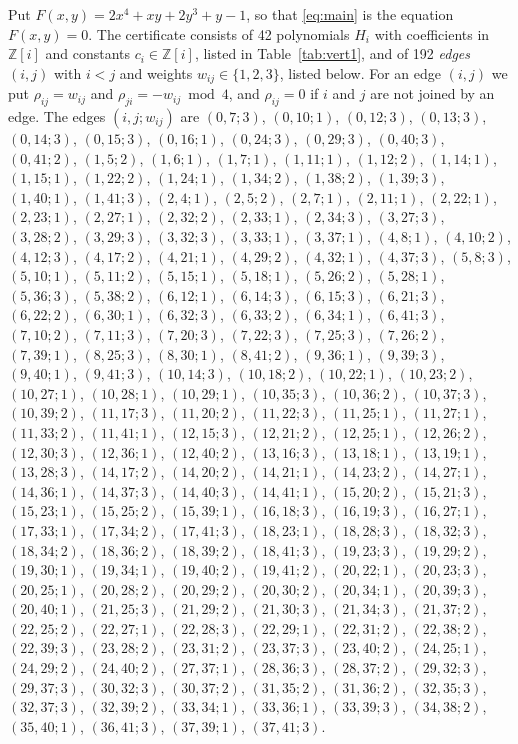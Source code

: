 \documentclass[11pt]{article}
\newcommand{\Z}{\mathbb{Z}}
\begin{document}
Put $F(x,y)=2x^{4}+xy+2y^{3}+y-1$, so that \eqref{eq:main} is the equation $F(x,y)=0$. The certificate consists of 42 polynomials $H_i$ with coefficients in $\Z[i]$ and constants $c_i\in\Z[i]$, listed in Table~\ref{tab:vert1}, and of 192 \emph{edges} $(i,j)$ with $i<j$ and weights $w_{ij}\in\{1,2,3\}$, listed below. For an edge $(i,j)$ we put $\rho_{ij}=w_{ij}$ and $\rho_{ji}=-w_{ij}\bmod 4$, and $\rho_{ij}=0$ if $i$ and $j$ are not joined by an edge.
The edges $(i,j;w_{ij})$ are $(0,7;3)$, $(0,10;1)$, $(0,12;3)$, $(0,13;3)$, $(0,14;3)$, $(0,15;3)$, $(0,16;1)$, $(0,24;3)$, $(0,29;3)$, $(0,40;3)$, $(0,41;2)$, $(1,5;2)$, $(1,6;1)$, $(1,7;1)$, $(1,11;1)$, $(1,12;2)$, $(1,14;1)$, $(1,15;1)$, $(1,22;2)$, $(1,24;1)$, $(1,34;2)$, $(1,38;2)$, $(1,39;3)$, $(1,40;1)$, $(1,41;3)$, $(2,4;1)$, $(2,5;2)$, $(2,7;1)$, $(2,11;1)$, $(2,22;1)$, $(2,23;1)$, $(2,27;1)$, $(2,32;2)$, $(2,33;1)$, $(2,34;3)$, $(3,27;3)$, $(3,28;2)$, $(3,29;3)$, $(3,32;3)$, $(3,33;1)$, $(3,37;1)$, $(4,8;1)$, $(4,10;2)$, $(4,12;3)$, $(4,17;2)$, $(4,21;1)$, $(4,29;2)$, $(4,32;1)$, $(4,37;3)$, $(5,8;3)$, $(5,10;1)$, $(5,11;2)$, $(5,15;1)$, $(5,18;1)$, $(5,26;2)$, $(5,28;1)$, $(5,36;3)$, $(5,38;2)$, $(6,12;1)$, $(6,14;3)$, $(6,15;3)$, $(6,21;3)$, $(6,22;2)$, $(6,30;1)$, $(6,32;3)$, $(6,33;2)$, $(6,34;1)$, $(6,41;3)$, $(7,10;2)$, $(7,11;3)$, $(7,20;3)$, $(7,22;3)$, $(7,25;3)$, $(7,26;2)$, $(7,39;1)$, $(8,25;3)$, $(8,30;1)$, $(8,41;2)$, $(9,36;1)$, $(9,39;3)$, $(9,40;1)$, $(9,41;3)$, $(10,14;3)$, $(10,18;2)$, $(10,22;1)$, $(10,23;2)$, $(10,27;1)$, $(10,28;1)$, $(10,29;1)$, $(10,35;3)$, $(10,36;2)$, $(10,37;3)$, $(10,39;2)$, $(11,17;3)$, $(11,20;2)$, $(11,22;3)$, $(11,25;1)$, $(11,27;1)$, $(11,33;2)$, $(11,41;1)$, $(12,15;3)$, $(12,21;2)$, $(12,25;1)$, $(12,26;2)$, $(12,30;3)$, $(12,36;1)$, $(12,40;2)$, $(13,16;3)$, $(13,18;1)$, $(13,19;1)$, $(13,28;3)$, $(14,17;2)$, $(14,20;2)$, $(14,21;1)$, $(14,23;2)$, $(14,27;1)$, $(14,36;1)$, $(14,37;3)$, $(14,40;3)$, $(14,41;1)$, $(15,20;2)$, $(15,21;3)$, $(15,23;1)$, $(15,25;2)$, $(15,39;1)$, $(16,18;3)$, $(16,19;3)$, $(16,27;1)$, $(17,33;1)$, $(17,34;2)$, $(17,41;3)$, $(18,23;1)$, $(18,28;3)$, $(18,32;3)$, $(18,34;2)$, $(18,36;2)$, $(18,39;2)$, $(18,41;3)$, $(19,23;3)$, $(19,29;2)$, $(19,30;1)$, $(19,34;1)$, $(19,40;2)$, $(19,41;2)$, $(20,22;1)$, $(20,23;3)$, $(20,25;1)$, $(20,28;2)$, $(20,29;2)$, $(20,30;2)$, $(20,34;1)$, $(20,39;3)$, $(20,40;1)$, $(21,25;3)$, $(21,29;2)$, $(21,30;3)$, $(21,34;3)$, $(21,37;2)$, $(22,25;2)$, $(22,27;1)$, $(22,28;3)$, $(22,29;1)$, $(22,31;2)$, $(22,38;2)$, $(22,39;3)$, $(23,28;2)$, $(23,31;2)$, $(23,37;3)$, $(23,40;2)$, $(24,25;1)$, $(24,29;2)$, $(24,40;2)$, $(27,37;1)$, $(28,36;3)$, $(28,37;2)$, $(29,32;3)$, $(29,37;3)$, $(30,32;3)$, $(30,37;2)$, $(31,35;2)$, $(31,36;2)$, $(32,35;3)$, $(32,37;3)$, $(32,39;2)$, $(33,34;1)$, $(33,36;1)$, $(33,39;3)$, $(34,38;2)$, $(35,40;1)$, $(36,41;3)$, $(37,39;1)$, $(37,41;3)$.
\end{document}

